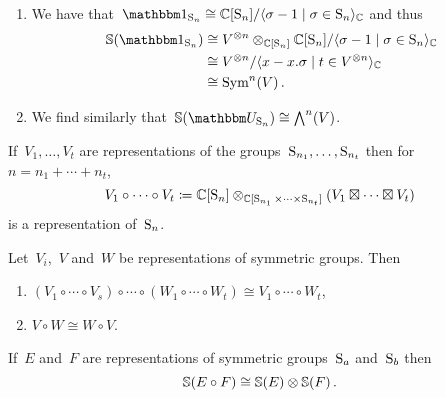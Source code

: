\documentclass[a4paper,10pt]{scrartcl}
\begin{document}
\begin{example}
  \leavevmode
  \begin{enumerate}
    \item
      We have that~$\trivrep_{\symm_n} \cong \Complex[\symm_n]/\gen{\sigma - 1 \suchthat \sigma \in \symm_n}_{\Complex}$ and thus
      \begin{align*}
        \Schur( \trivrep_{\symm_n} )
        &\cong
        V^{\tensor n} \tensor_{\Complex[\symm_n]} \Complex[\symm_n]/\gen{\sigma - 1 \suchthat \sigma \in \symm_n}_{\Complex}
        \\
        &\cong
        V^{\tensor n}/\gen{x - x.\sigma \suchthat t \in V^{\tensor n}}_{\Complex}
        \\
        &\cong
        \Symm^n(V) \,.
      \end{align*}
    \item
      We find similarly that~$\Schur( \signrep_{\symm_n} ) \cong \Exterior^n(V)$.
  \end{enumerate}
\end{example}

If~$V_1, \dotsc, V_t$ are representations of the groups~$\operatorname{S}_{n_1}, \dotsc, \operatorname{S}_{n_t}$ then for~$n = n_1 + \dotsb + n_t$,
\[
  V_1 \circ \dotsb \circ V_t
  \coloneqq
  \mathbb{C}[\operatorname{S}_n]
  \otimes_{\mathbb{C}[\operatorname{S}_{n_1} \times \dotsb \times \operatorname{S}_{n_t}]}
  (V_1 \boxtimes \dotsb \boxtimes V_t)
\]
is a representation of~$\operatorname{S}_n$.

\begin{lemma}
  \label{properties of circle product}
  Let~$V_i$,~$V$ and~$W$ be representations of symmetric groups.
  Then
  \begin{enumerate}
    \item
      $(V_1 \circ \dotsb \circ V_s) \circ \dotsb \circ (W_1 \circ \dotsb \circ W_t) \cong V_1 \circ \dotsb \circ W_t$,
    \item
      $V \circ W \cong W \circ V$.
  \end{enumerate}
\end{lemma}

\begin{lemma}
  \label{multiplicativity of schur functor}
  If~$E$ and~$F$ are representations of symmetric groups~$\operatorname{S}_a$ and~$\operatorname{S}_b$ then
  \[
    \mathbb{S}(E \circ F) \cong \mathbb{S}(E) \otimes \mathbb{S}(F) \,.
  \]
\end{lemma}
\end{document}
